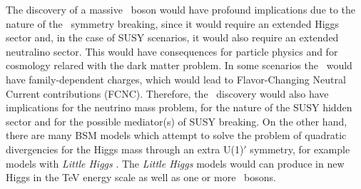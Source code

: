 The discovery of a massive \Zprime~boson would have profound implications due to the nature of 
the \Uprime~symmetry breaking, since it would require an extended Higgs sector and, in the case 
of SUSY scenarios, it would also require an extended neutralino sector\cite{Langacker:2008yv}. 
This would have consequences for particle physics and for cosmology relared with the dark matter problem. In some scenarios
the \Zprime~would have family-dependent charges, which would lead to Flavor-Changing Neutral Current 
contributions (FCNC)\cite{Langacker:2008yv}. Therefore, the \Zprime~discovery would also have implications for 
the neutrino mass problem, for the nature of the SUSY hidden sector and for the possible 
mediator(s) of SUSY breaking. On the other hand, there are many BSM models which attempt to 
solve the problem of quadratic divergencies for  the Higgs mass through an extra U(1)$'$ symmetry, 
for example models with \emph{Little Higgs} \cite{Langacker:2008yv}. The \emph{Little Higgs} models would
can produce in new Higgs in the TeV energy scale as well as one or more \Zprime~bosons.\\


